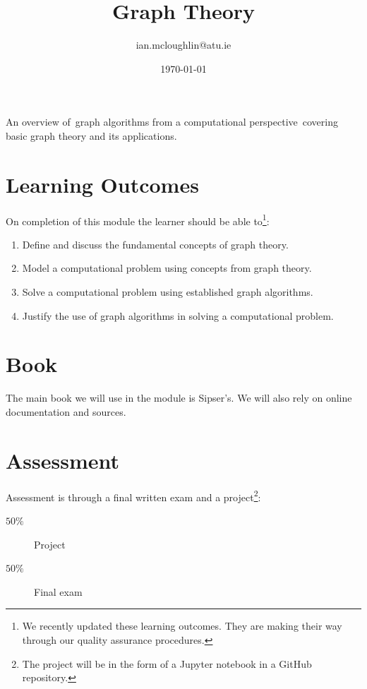 \documentclass{iansnotes}
\title{Graph Theory}
\author{ian.mcloughlin@atu.ie}
\date{\today}
\begin{document}
\maketitle
An overview of graph algorithms from a computational perspective covering basic graph theory and its applications.


\section{Learning Outcomes}
On completion of this module the learner should be able to\footnote{We recently updated these learning outcomes. They are making their way through our quality assurance procedures.}:

\begin{enumerate}
  \item Define and discuss the fundamental concepts of graph theory.
  \item Model a computational problem using concepts from graph theory.
  \item Solve a computational problem using established graph algorithms.
  \item Justify the use of graph algorithms in solving a computational problem.
\end{enumerate}


\section{Book}
The main book we will use in the module is Sipser's\autocite{sipser}.
We will also rely on online documentation and sources.


\section{Assessment}
Assessment is through a final written exam and a project\footnote{The project will be in the form of a Jupyter notebook in a GitHub repository.}:

\begin{description}
  \item[$50\%$] Project
  \item[$50\%$] Final exam
\end{description}

 
\end{document}
